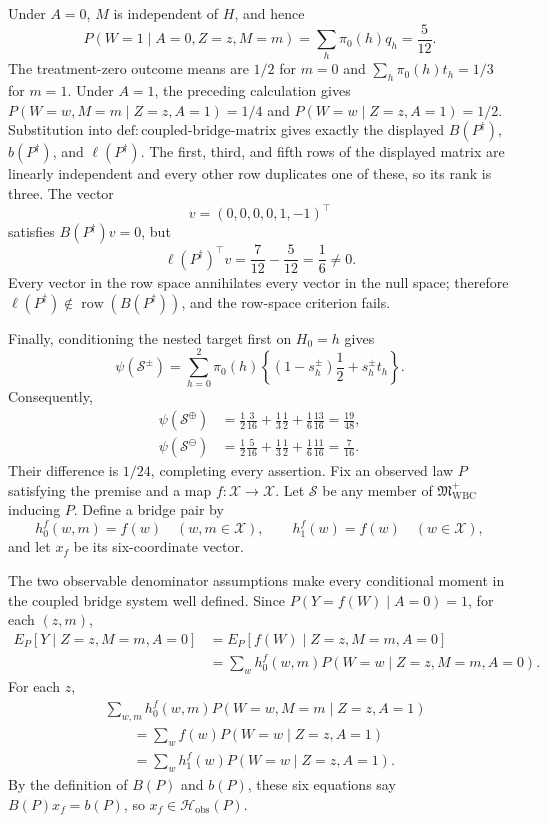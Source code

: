 Under \(A=0\), \(M\) is independent of \(H\), and hence
\[
 P(W=1\mid A=0,Z=z,M=m)=\sum_h\pi _0(h)q_h=\frac5{12}.
\]
The treatment-zero outcome means are \(1/2\) for \(m=0\) and
\(\sum_h\pi _0(h)t_h=1/3\) for \(m=1\).  Under \(A=1\), the preceding
calculation gives \(P(W=w,M=m\mid Z=z,A=1)=1/4\) and
\(P(W=w\mid Z=z,A=1)=1/2\).  Substitution into
\(\mathrm{def{:}coupled\text{-}bridge\text{-}matrix}\) gives exactly the
displayed \(B(P^{\dagger})\), \(b(P^{\dagger})\), and
\(\ell(P^{\dagger})\).  The first, third, and fifth rows of the displayed
matrix are linearly independent and every other row duplicates one of these,
so its rank is three.  The vector
\[
 v=(0,0,0,0,1,-1)^{\top}
\]
satisfies \(B(P^{\dagger})v=0\), but
\[
 \ell(P^{\dagger})^{\top}v=\frac7{12}-\frac5{12}=\frac16\ne0.
\]
Every vector in the row space annihilates every vector in the null space;
therefore \(\ell(P^{\dagger})\notin
\operatorname{row}(B(P^{\dagger}))\), and the row-space criterion fails.

Finally, conditioning the nested target first on \(H_0=h\) gives
\[
 \psi(\mathcal S^{\pm})
 =\sum_{h=0}^2\pi _0(h)
 \left\{(1-s_h^{\pm})\frac12+s_h^{\pm}t_h\right\}.
\]
Consequently,
\[
\begin{aligned}
 \psi(\mathcal S^{\oplus})
 &=\frac12\frac3{16}+\frac13\frac12+\frac16\frac{13}{16}
   =\frac{19}{48},\\
 \psi(\mathcal S^{\ominus})
 &=\frac12\frac5{16}+\frac13\frac12+\frac16\frac{11}{16}
   =\frac7{16}.
\end{aligned}
\]
Their difference is \(1/24\), completing every assertion.
Fix an observed law \(P\) satisfying the premise and a map
\(f:\mathcal X\to\mathcal X\).  Let \(\mathcal S\) be any member of
\(\mathfrak M_{\mathrm{WBC}}^{+}\) inducing \(P\).  Define a bridge pair by
\[
 h_0^f(w,m)=f(w)\quad(w,m\in\mathcal X),
 \qquad h_1^f(w)=f(w)\quad(w\in\mathcal X),
\]
and let \(x_f\) be its six-coordinate vector.

The two observable denominator assumptions make every conditional moment in
the coupled bridge system well defined.  Since
\(P(Y=f(W)\mid A=0)=1\), for each \((z,m)\),
\[
\begin{aligned}
 E_P[Y\mid Z=z,M=m,A=0]
 &=E_P[f(W)\mid Z=z,M=m,A=0]\\
 &=\sum_w h_0^f(w,m)P(W=w\mid Z=z,M=m,A=0).
\end{aligned}
\]
For each \(z\),
\[
\begin{aligned}
 &\sum_{w,m}h_0^f(w,m)P(W=w,M=m\mid Z=z,A=1)\\
 &\qquad=\sum_w f(w)P(W=w\mid Z=z,A=1)\\
 &\qquad=\sum_w h_1^f(w)P(W=w\mid Z=z,A=1).
\end{aligned}
\]
By the definition of \(B(P)\) and \(b(P)\), these six equations say
\(B(P)x_f=b(P)\), so \(x_f\in\mathcal H_{\mathrm{obs}}(P)\).

